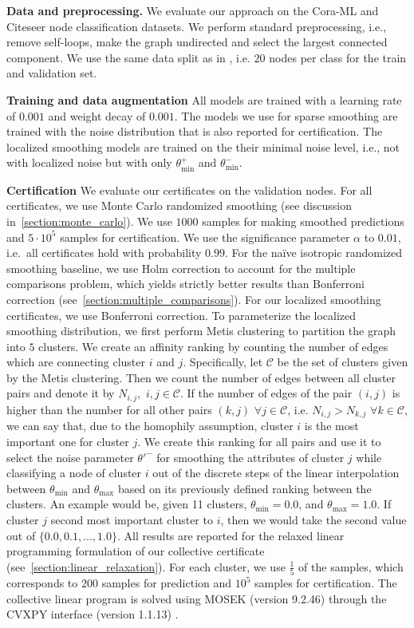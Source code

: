 \textbf{Data and preprocessing.} We evaluate our approach on the Cora-ML and Citeseer node classification datasets. We perform standard preprocessing, i.e., remove self-loops, make the graph undirected and select the largest connected component. 
We use the same data split as in \citep{Schuchardt2021}, i.e. $20$ nodes per class for the train and validation set.

\textbf{Training and data augmentation} All models are trained with a learning rate of $0.001$ and weight decay of $0.001$. The models we use for sparse smoothing are trained with the noise distribution that is also reported for certification. The localized smoothing models are trained on the their minimal noise level, i.e., not with localized noise but with only $\theta^+_\mathrm{min}$ and $\theta^-_\mathrm{min}$. 

\textbf{Certification} 
We evaluate our certificates on the validation nodes.
For all certificates, we use Monte Carlo randomized smoothing (see discussion in~\autoref{section:monte_carlo}).
We use $1000$ samples for making smoothed predictions and $5 \cdot 10^5$ samples for certification.
We use the significance parameter $\alpha$ to $0.01$, i.e.~all certificates hold with probability $0.99$.
For the na\"ive isotropic randomized smoothing baseline, we use Holm correction to account for the multiple comparisons problem, which yields strictly better results than Bonferroni correction (see~\autoref{section:multiple_comparisons}).
For our localized smoothing certificates, we use Bonferroni correction.
To parameterize the localized smoothing distribution, we first perform Metis clustering \citep{MetisClustering} to partition the graph into $5$ clusters. We create an affinity ranking by counting the number of edges which are connecting cluster $i$ and $j$. Specifically, let $\mathcal{C}$ be the set of clusters given by the Metis clustering. Then we count the number of edges between all cluster pairs and denote it by $N_{i,j},\,\, i,j \in \mathcal{C}$. If the number of edges of the pair $(i,j)$ is higher than the number for all other pairs $(k, j) \,\, \forall j\in \mathcal{C}$, i.e. $N_{i,j} > N_{k, j} \,\, \forall k \in \mathcal{C}$, we can say that, due to the homophily assumption, cluster $i$ is the most important one for cluster $j$. We create this ranking for all pairs and use it to select the noise parameter $\theta'^{-}$ for smoothing the attributes of cluster $j$ while classifying a node of cluster $i$ out of the discrete steps of the linear interpolation between $\theta_\mathrm{min}$ and $\theta_\mathrm{max}$ based on its previously defined ranking between the clusters. An example would be, given 11 clusters, $\theta_\mathrm{min} = 0.0$, and $\theta_\mathrm{max} = 1.0$. If cluster $j$ second most important cluster to $i$, then we would take  the second value out of $\{0.0, 0.1, \dots, 1.0\}$.
All results are reported for the relaxed linear programming formulation of our collective certificate (see~\autoref{section:linear_relaxation}). 
For each cluster, we use $\frac{1}{5}$ of the samples, which corresponds to $200$ samples for prediction and $10^5$ samples for certification.
The collective linear program is solved using MOSEK (version 9.2.46) \citep{mosek} through the CVXPY interface (version 1.1.13) \citep{cvxpy}.

